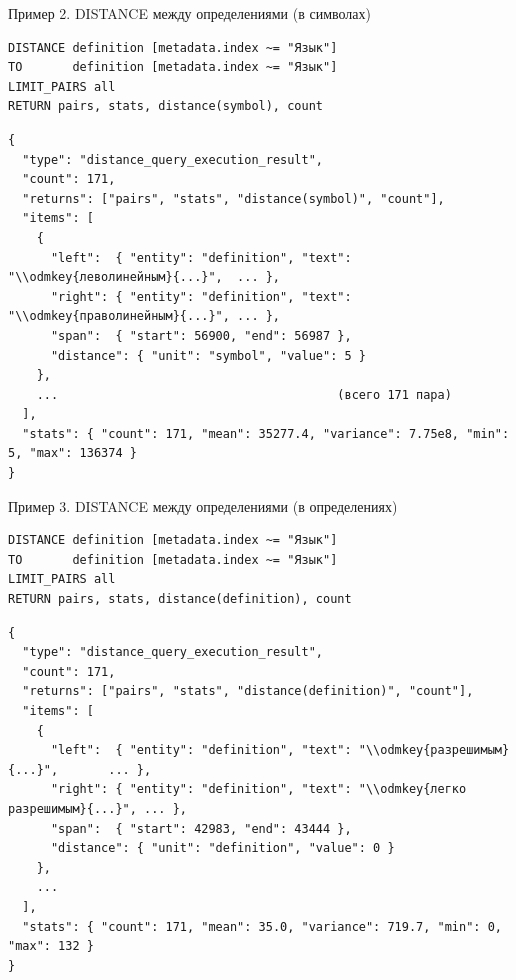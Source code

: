 \documentclass[aspectratio=169,11pt]{beamer}
\begin{document}
\begin{frame}[fragile]{Пример 2. DISTANCE между определениями (в символах)}
\begin{Verbatim}[fontsize=\small,frame=single,formatcom=\color{dslkw}]
DISTANCE definition [metadata.index ~= "Язык"]
TO       definition [metadata.index ~= "Язык"]
LIMIT_PAIRS all
RETURN pairs, stats, distance(symbol), count
\end{Verbatim}
\begin{Verbatim}[fontsize=\scriptsize,frame=single]
{
  "type": "distance_query_execution_result",
  "count": 171,
  "returns": ["pairs", "stats", "distance(symbol)", "count"],
  "items": [
    {
      "left":  { "entity": "definition", "text": "\\odmkey{леволинейным}{...}",  ... },
      "right": { "entity": "definition", "text": "\\odmkey{праволинейным}{...}", ... },
      "span":  { "start": 56900, "end": 56987 },
      "distance": { "unit": "symbol", "value": 5 }
    },
    ...                                       (всего 171 пара)
  ],
  "stats": { "count": 171, "mean": 35277.4, "variance": 7.75e8, "min": 5, "max": 136374 }
}
\end{Verbatim}
\end{frame}

\begin{frame}[fragile]{Пример 3. DISTANCE между определениями (в определениях)}
\begin{Verbatim}[fontsize=\small,frame=single,formatcom=\color{dslkw}]
DISTANCE definition [metadata.index ~= "Язык"]
TO       definition [metadata.index ~= "Язык"]
LIMIT_PAIRS all
RETURN pairs, stats, distance(definition), count
\end{Verbatim}
\begin{Verbatim}[fontsize=\scriptsize,frame=single]
{
  "type": "distance_query_execution_result",
  "count": 171,
  "returns": ["pairs", "stats", "distance(definition)", "count"],
  "items": [
    {
      "left":  { "entity": "definition", "text": "\\odmkey{разрешимым}{...}",       ... },
      "right": { "entity": "definition", "text": "\\odmkey{легко разрешимым}{...}", ... },
      "span":  { "start": 42983, "end": 43444 },
      "distance": { "unit": "definition", "value": 0 }
    },
    ...
  ],
  "stats": { "count": 171, "mean": 35.0, "variance": 719.7, "min": 0, "max": 132 }
}
\end{Verbatim}
\end{frame}
\end{document}
